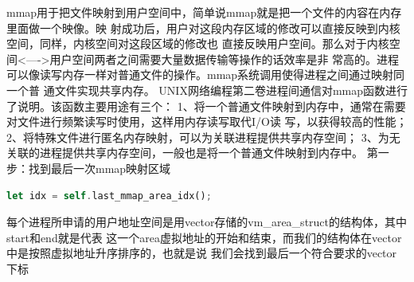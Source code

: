 mmap用于把文件映射到用户空间中，简单说mmap就是把一个文件的内容在内存里面做一个映像。映
射成功后，用户对这段内存区域的修改可以直接反映到内核空间，同样，内核空间对这段区域的修改也
直接反映用户空间。那么对于内核空间<---->用户空间两者之间需要大量数据传输等操作的话效率是非
常高的。进程可以像读写内存一样对普通文件的操作。mmap系统调用使得进程之间通过映射同一个普
通文件实现共享内存。
UNIX网络编程第二卷进程间通信对mmap函数进行了说明。该函数主要用途有三个：
1、将一个普通文件映射到内存中，通常在需要对文件进行频繁读写时使用，这样用内存读写取代I/O读
写，以获得较高的性能；
2、将特殊文件进行匿名内存映射，可以为关联进程提供共享内存空间；
3、为无关联的进程提供共享内存空间，一般也是将一个普通文件映射到内存中。
第一步：找到最后一次mmap映射区域
\begin{lstlisting}[language=rust]
    let idx = self.last_mmap_area_idx();
\end{lstlisting}
每个进程所申请的用户地址空间是用vector存储的vm_area_struct的结构体，其中start和end就是代表
这一个area虚拟地址的开始和结束，而我们的结构体在vector中是按照虚拟地址升序排序的，也就是说
我们会找到最后一个符合要求的vector下标


